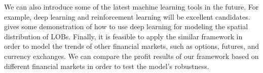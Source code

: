 We can also introduce some of the latest machine learning tools  in the future. For example, deep learning and reinforcement learning will be excellent candidates. \cite{sirignano2016deep} gives some demonstration of how to use deep learning for modeling the spatial distribution of LOBs.  Finally, it is feasible to apply the similar framework in order to model the trends of other financial markets, such as options, futures, and currency exchanges. We can compare the profit results of our framework based on different financial markets in order to test the model's robustness.
 
